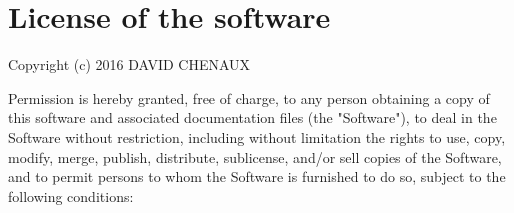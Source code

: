 \documentclass[a4paper, 11pt, oneside]{thesis}  %
\begin{document}
\listoftables  %






\mainmatter	  %
\pagestyle{fancy}  %
\setcounter{page}{8}
















\appendix %



\printglossaries

\chapter{License of the software}
\label{appendix:license}

Copyright (c) 2016 DAVID CHENAUX

Permission is hereby granted, free of charge, to any person obtaining a copy of this software and associated documentation files (the "Software"), to deal in the Software without restriction, including without limitation the rights to use, copy, modify, merge, publish, distribute, sublicense, and/or sell copies of the Software, and to permit persons to whom the Software is furnished to do so, subject to the following conditions:
\end{document}

